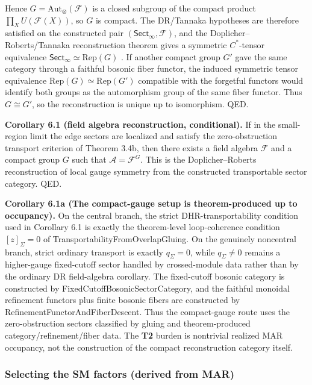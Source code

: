 Hence \(G=\mathrm{Aut}_\otimes(\mathcal F)\) is a closed subgroup of the compact product \(\prod_X U(\mathcal F(X))\), so \(G\) is compact. The DR/Tannaka hypotheses are therefore satisfied on the constructed pair \((\mathsf{Sect}_\infty,\mathcal F)\), and the Doplicher--Roberts/Tannaka reconstruction theorem gives a symmetric \(C^*\)-tensor equivalence \(\mathsf{Sect}_\infty \simeq \mathrm{Rep}(G)\) \cite{dr89,dr90}. If another compact group \(G'\) gave the same category through a faithful bosonic fiber functor, the induced symmetric tensor equivalence \(\mathrm{Rep}(G)\simeq\mathrm{Rep}(G')\) compatible with the forgetful functors would identify both groups as the automorphism group of the same fiber functor. Thus \(G\cong G'\), so the reconstruction is unique up to isomorphism. QED.

\textbf{Corollary 6.1 (field algebra reconstruction, conditional).} If in the small-region limit the edge sectors are localized and satisfy the zero-obstruction transport criterion of Theorem 3.4b, then there exists a field algebra \(\mathcal F\) and a compact group \(G\) such that \(\mathcal A = \mathcal F^G\). This is the Doplicher--Roberts reconstruction of local gauge symmetry from the constructed transportable sector category. QED.

\textbf{Corollary 6.1a (The compact-gauge setup is theorem-produced up to occupancy).} On the central branch, the strict DHR-transportability condition used in Corollary 6.1 is exactly the theorem-level loop-coherence condition \([z]_\Sigma=0\) of TransportabilityFromOverlapGluing. On the genuinely noncentral branch, strict ordinary transport is exactly \(q_\Sigma=0\), while \(q_\Sigma\ne0\) remains a higher-gauge fixed-cutoff sector handled by crossed-module data rather than by the ordinary DR field-algebra corollary. The fixed-cutoff bosonic category is constructed by FixedCutoffBosonicSectorCategory, and the faithful monoidal refinement functors plus finite bosonic fibers are constructed by RefinementFunctorAndFiberDescent. Thus the compact-gauge route uses the zero-obstruction sectors classified by gluing and theorem-produced category/refinement/fiber data. The \textbf{T2} burden is nontrivial realized MAR occupancy, not the construction of the compact reconstruction category itself.

\subsubsection{Selecting the SM factors (derived from MAR)}\label{62-selecting-the-sm-factors-derived-from-mar}

